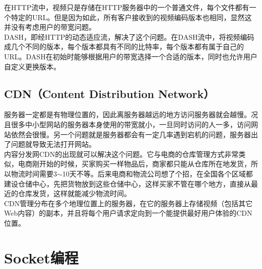 在HTTP流中，视频只是存储在HTTP服务器中的一个普通文件，每个文件都有一个特定的URL。但是因为如此，所有客户接收到的视频编码版本也相同，显然这并没有考虑用户的带宽问题。\\

DASH，即经HTTP的动态适应流，解决了这个问题。在DASH流中，将视频编码成几个不同的版本，每个版本都具有不同的比特率，每个版本都有属于自己的URL。DASH在初始时能够根据用户的带宽选择一个合适的版本，同时也允许用户自定义更换版本。\\

\subsection{CDN（Content Distribution Network）}

服务器一定都是有物理位置的，因此离服务器越远的地方访问服务器就会越慢。况且很多中小型网站的服务器本身使用的带宽就小，一旦同时访问的人一多，访问网站依然会很慢。另一个问题就是服务器都会有一定几率遇到宕机的问题，服务器出了问题就导致无法打开网站。\\

内容分发网CDN的出现就可以解决这个问题。它与电商的仓库管理方式非常类似，电商刚开始的时候，买家购买一样物品后，商家都只能从仓库所在地发货，所以物流时间需要3$ \sim $10天不等。后来电商和物流公司想了个招，在全国各个区域都建设仓储中心，先把货物放到这些仓储中心，这样买家不管在哪个地方，直接从最近的仓库发货，这样就能减少物流时间。\\

CDN管理分布在多个地理位置上的服务器，在它的服务器上存储视频（包括其它Web内容）的副本，并且将每个用户请求定向到一个能提供最好用户体验的CDN位置。

\newpage

\section{Socket编程}

